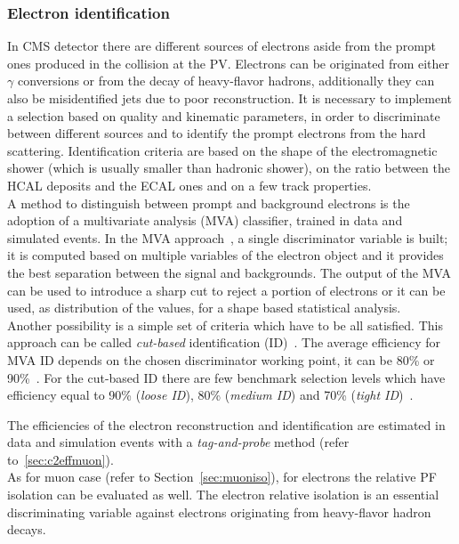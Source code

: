 \subsubsection{Electron identification}\label{sec:c2keleid}
In CMS detector there are different sources of electrons aside from the
prompt ones produced in the collision at the PV. Electrons can be
originated from either $\gamma$ conversions or from the decay of heavy-flavor
hadrons, additionally they can also be misidentified jets due to poor
reconstruction. It is necessary to implement a selection based on quality and
kinematic parameters,  in order to discriminate between different 
sources and to identify the
prompt electrons from the hard scattering.
Identification criteria are based on the shape of the electromagnetic shower
(which is usually smaller than hadronic shower), on the ratio between the
HCAL deposits and the ECAL ones and on a few track properties.\\
A method to distinguish between prompt and background
electrons is the adoption of a multivariate
analysis (MVA) classifier, trained in data and simulated events. In the MVA approach~\cite{mvatwiki}, a
single discriminator variable is built; it is computed based on
multiple variables of the electron object and it provides the best
separation between the signal and backgrounds. The output of the MVA
can be used to introduce a sharp cut to reject a portion of electrons
or it can be used, as distribution of the values, for a shape based
statistical analysis.\\
Another possibility is a simple set of criteria which have to be
all satisfied. This approach can be called \emph{cut-based}
identification (ID)~\cite{cutbasedtwiki}. The average efficiency for MVA
ID depends on the chosen discriminator working point, it can be 80\% or
90\%~\cite{mvatwiki}. For the cut-based ID there are few benchmark selection levels
which have efficiency equal to 90\% (\emph{loose ID}), 80\% (\emph{medium
  ID}) and 70\% (\emph{tight ID})~\cite{cutbasedtwiki}.

The efficiencies of the electron reconstruction and identification are
estimated in data and simulation events with a \emph{tag-and-probe}
method (refer to~\ref{sec:c2effmuon}).\\

As for muon case (refer to Section~\ref{sec:muoniso}), for electrons
the relative PF isolation can be evaluated as well. The electron
relative isolation is an essential discriminating variable against 
electrons originating from heavy-flavor hadron decays.


